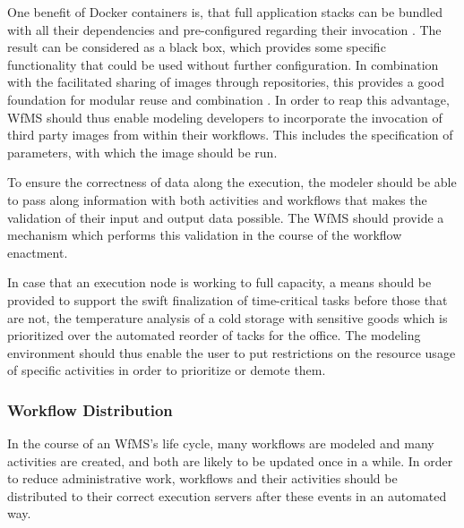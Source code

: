       One benefit of Docker containers is, that full application stacks can be bundled with all their dependencies and pre-configured regarding their invocation \cite[p.~82]{Bernstein2014Containers}. The result can be considered as a black box, which provides some specific functionality that could be used without further configuration. In combination with the facilitated sharing of images through repositories, this provides a good foundation for modular reuse and combination \cite[p.~6]{Boettiger2015Introduction}.
      In order to reap this advantage, \ac{WfMS} should thus enable modeling developers to incorporate the invocation of third party images from within their workflows. This includes the specification of parameters, with which the image should be run.

      To ensure the correctness of data along the execution, the modeler should be able to pass along information with both activities and workflows that makes the validation of their input and output data possible. The \ac{WfMS} should provide a mechanism which performs this validation in the course of the workflow enactment.

      In case that an execution node is working to full capacity, a means should be provided to support the swift finalization of time-critical tasks before those that are not, \eg the temperature analysis of a cold storage with sensitive goods which is prioritized over the automated reorder of tacks for the office. The modeling environment should thus enable the user to put restrictions on the resource usage of specific activities in order to prioritize or demote them.


  \subsubsection{Workflow Distribution} %
    \label{ssub:workflow_distribution}

      In the course of an \ac{WfMS}'s life cycle, many workflows are modeled and many activities are created, and both are likely to be updated once in a while. In order to reduce administrative work, workflows and their activities should be distributed to their correct execution servers after these events in an automated way.



